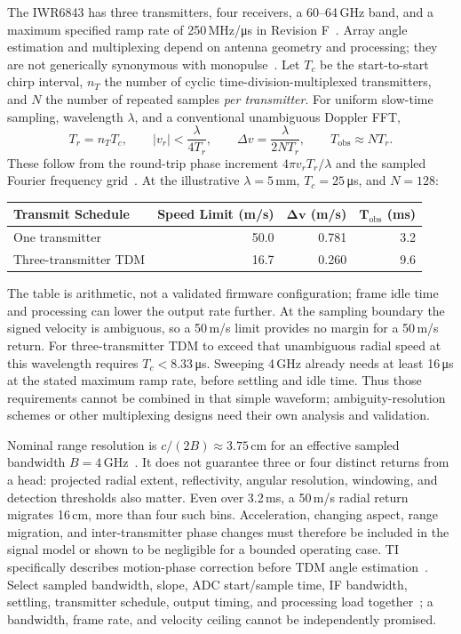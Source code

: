 The IWR6843 has three transmitters, four receivers, a 60--64\,GHz band, and a maximum specified ramp rate of 250\,MHz/\si{\micro\second} in Revision F~\cite{iwr6843}.
Array angle estimation and multiplexing depend on antenna geometry and processing; they are not generically synonymous with monopulse~\cite{timimo}.
Let $T_c$ be the start-to-start chirp interval, $n_T$ the number of cyclic time-division-multiplexed transmitters, and $N$ the number of repeated samples \emph{per transmitter}.
For uniform slow-time sampling, wavelength $\lambda$, and a conventional unambiguous Doppler FFT,
\begin{equation}
\label{eq:screw-chirp}
T_r=n_TT_c,\qquad |v_r|<\frac{\lambda}{4T_r},\qquad
\Delta v=\frac{\lambda}{2NT_r},\qquad T_{\mathrm{obs}}\approx NT_r.
\end{equation}
These follow from the round-trip phase increment $4\pi v_rT_r/\lambda$ and the sampled Fourier frequency grid~\cite{tichirp,timimo}.
At the illustrative $\lambda=5$\,mm, $T_c=25$\,\si{\micro\second}, and $N=128$:
\begin{center}\small
\begin{tabular}{@{}lrrr@{}}
\toprule
\textbf{Transmit Schedule} & \textbf{Speed Limit (m/s)} & $\boldsymbol{\Delta v}$ \textbf{(m/s)} & $\boldsymbol{T_{\mathrm{obs}}}$ \textbf{(ms)} \\
\midrule
One transmitter & 50.0 & 0.781 & 3.2 \\
Three-transmitter TDM & 16.7 & 0.260 & 9.6 \\
\bottomrule
\end{tabular}
\end{center}
The table is arithmetic, not a validated firmware configuration; frame idle time and processing can lower the output rate further.
At the sampling boundary the signed velocity is ambiguous, so a 50\,m/s limit provides no margin for a 50\,m/s return.
For three-transmitter TDM to exceed that unambiguous radial speed at this wavelength requires $T_c<8.33$\,\si{\micro\second}.
Sweeping 4\,GHz already needs at least 16\,\si{\micro\second} at the stated maximum ramp rate, before settling and idle time.
Thus those requirements cannot be combined in that simple waveform; ambiguity-resolution schemes or other multiplexing designs need their own analysis and validation.

Nominal range resolution is $c/(2B)\approx3.75$\,cm for an effective sampled bandwidth $B=4$\,GHz~\cite{tichirp}.
It does not guarantee three or four distinct returns from a head: projected radial extent, reflectivity, angular resolution, windowing, and detection thresholds also matter.
Even over 3.2\,ms, a 50\,m/s radial return migrates 16\,cm, more than four such bins.
Acceleration, changing aspect, range migration, and inter-transmitter phase changes must therefore be included in the signal model or shown to be negligible for a bounded operating case.
TI specifically describes motion-phase correction before TDM angle estimation~\cite{timimo}.
Select sampled bandwidth, slope, ADC start/sample time, IF bandwidth, settling, transmitter schedule, output timing, and processing load together~\cite{tichirp}; a bandwidth, frame rate, and velocity ceiling cannot be independently promised.

